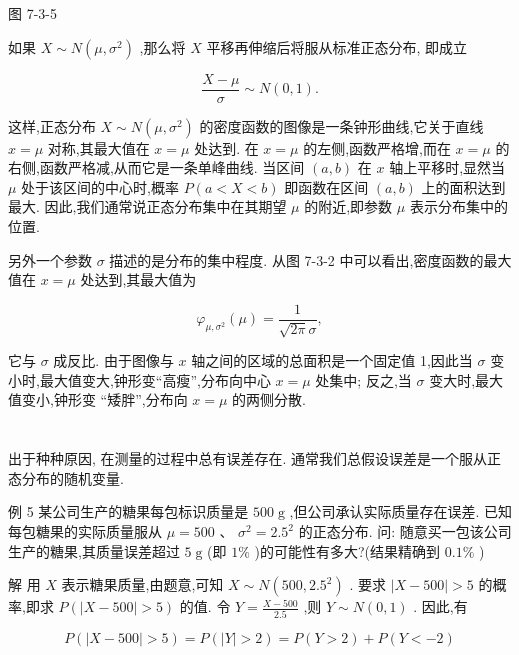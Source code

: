 \documentclass[10pt]{article}
\begin{document}
图 7-3-5

如果 \(X \sim  N\left( {\mu ,{\sigma }^{2}}\right)\) ,那么将 \(X\) 平移再伸缩后将服从标准正态分布, 即成立

\[
\frac{X - \mu }{\sigma } \sim  N\left( {0,1}\right) .
\]

这样,正态分布 \(X \sim  N\left( {\mu ,{\sigma }^{2}}\right)\) 的密度函数的图像是一条钟形曲线,它关于直线 \(x = \mu\) 对称,其最大值在 \(x = \mu\) 处达到. 在 \(x = \mu\) 的左侧,函数严格增,而在 \(x = \mu\) 的右侧,函数严格减,从而它是一条单峰曲线. 当区间 \(\left( {a,b}\right)\) 在 \(x\) 轴上平移时,显然当 \(\mu\) 处于该区间的中心时,概率 \(P\left( {a < X < b}\right)\) 即函数在区间 \(\left( {a,b}\right)\) 上的面积达到最大. 因此,我们通常说正态分布集中在其期望 \(\mu\) 的附近,即参数 \(\mu\) 表示分布集中的位置.

另外一个参数 \(\sigma\) 描述的是分布的集中程度. 从图 7-3-2 中可以看出,密度函数的最大值在 \(x = \mu\) 处达到,其最大值为

\[
{\varphi }_{\mu ,{\sigma }^{2}}\left( \mu \right)  = \frac{1}{\sqrt{2\pi }\sigma },
\]

它与 \(\sigma\) 成反比. 由于图像与 \(x\) 轴之间的区域的总面积是一个固定值 1,因此当 \(\sigma\) 变小时,最大值变大,钟形变“高瘦”,分布向中心 \(x = \mu\) 处集中; 反之,当 \(\sigma\) 变大时,最大值变小,钟形变 “矮胖”,分布向 \(x = \mu\) 的两侧分散.

\section*{}



出于种种原因, 在测量的过程中总有误差存在. 通常我们总假设误差是一个服从正态分布的随机变量.

例 5 某公司生产的糖果每包标识质量是 \({500}\mathrm{\;g}\) ,但公司承认实际质量存在误差. 已知每包糖果的实际质量服从 \(\mu  = {500}\) 、 \({\sigma }^{2} = {2.5}^{2}\) 的正态分布. 问: 随意买一包该公司生产的糖果,其质量误差超过 \(5\mathrm{\;g}\) (即 \(1\%\) )的可能性有多大?(结果精确到 \({0.1}\%\) )

解 用 \(X\) 表示糖果质量,由题意,可知 \(X \sim  N\left( {{500},{2.5}^{2}}\right)\) . 要求 \(\left| {X - {500}}\right|  > 5\) 的概率,即求 \(P\left( {\left| {X - {500}}\right|  > 5}\right)\) 的值. 令 \(Y = \frac{X - {500}}{2.5}\) ,则 \(Y \sim  N\left( {0,1}\right)\) . 因此,有

\[
P\left( {\left| {X - {500}}\right|  > 5}\right)  = P\left( {\left| Y\right|  > 2}\right)  = P\left( {Y > 2}\right)  + P\left( {Y <  - 2}\right)
\]
\end{document}

